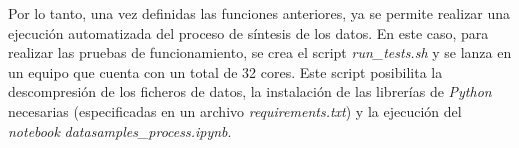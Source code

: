 \vspace{3mm}

Por lo tanto, una vez definidas las funciones anteriores, ya se permite realizar una ejecución automatizada del proceso de síntesis de los datos. En este caso, para realizar las pruebas de funcionamiento, se crea el script \textit{run\_tests.sh} y se lanza en un equipo que cuenta con un total de 32 cores. Este script posibilita la descompresión de los ficheros de datos, la instalación de las librerías de \textit{Python} necesarias (especificadas en un archivo \textit{requirements.txt}) y la ejecución del \textit{notebook} \textit{datasamples\_process.ipynb}.

\vspace{3mm}


  
  
  
  
  
  
  
